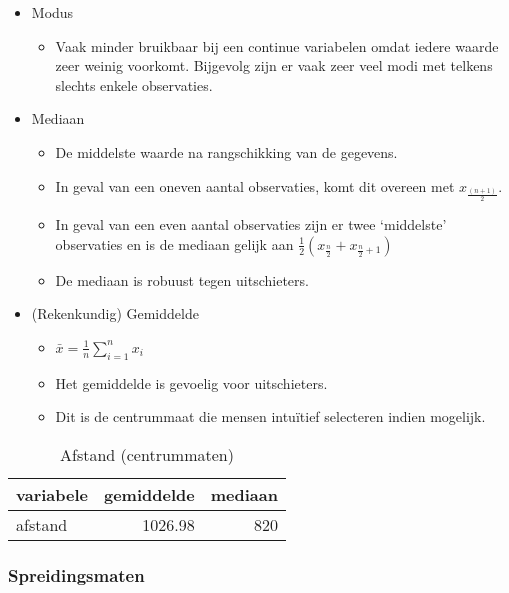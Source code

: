 \documentclass[]{memoir}
\providecommand{\tightlist}{%
  \setlength{\itemsep}{0pt}\setlength{\parskip}{0pt}}
\begin{document}
\begin{itemize}
\tightlist
\item
  Modus

  \begin{itemize}
  \tightlist
  \item
    Vaak minder bruikbaar bij een continue variabelen omdat iedere waarde zeer weinig voorkomt. Bijgevolg zijn er vaak zeer veel modi met telkens slechts enkele observaties.
  \end{itemize}
\item
  Mediaan

  \begin{itemize}
  \tightlist
  \item
    De middelste waarde na rangschikking van de gegevens.
  \item
    In geval van een oneven aantal observaties, komt dit overeen met \(x_{\frac{(n+1)}{2}}\).
  \item
    In geval van een even aantal observaties zijn er twee `middelste' observaties en is de mediaan gelijk aan \(\frac{1}{2}( x_{\frac{n}{2}}+x_{\frac{n}{2}+1})\)
  \item
    De mediaan is robuust tegen uitschieters.
  \end{itemize}
\item
  (Rekenkundig) Gemiddelde

  \begin{itemize}
  \tightlist
  \item
    \(\bar{x} = \frac{1}{n}\sum_{i=1}^n x_i\)
  \item
    Het gemiddelde is gevoelig voor uitschieters.
  \item
    Dit is de centrummaat die mensen intuïtief selecteren indien mogelijk.
  \end{itemize}
\end{itemize}

\begin{table}[t]

\caption{\label{tab:4-9}Afstand (centrummaten)}
\centering
\fontsize{10}{12}\selectfont
\begin{tabular}{lrr}
\toprule
variabele & gemiddelde & mediaan\\
\midrule
afstand & 1026.98 & 820\\
\bottomrule
\end{tabular}
\end{table}

\hypertarget{spreidingsmaten-1}{%
\subsubsection*{Spreidingsmaten}\label{spreidingsmaten-1}}
\end{document}
